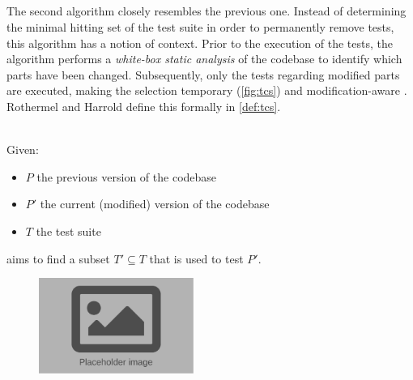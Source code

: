 
\subsection{\tcs{}}
The second algorithm closely resembles the previous one. Instead of determining the minimal hitting set of the test suite in order to permanently remove tests, this algorithm has a notion of context. Prior to the execution of the tests, the algorithm performs a \emph{white-box static analysis} of the codebase to identify which parts have been changed. Subsequently, only the tests regarding modified parts are executed, making the selection temporary (\autoref{fig:tcs}) and modification-aware \cite{10.1002/stv.430}. Rothermel and Harrold define this formally in \autoref{def:tcs}.

\begin{definition}[\tcs{}]
\label{def:tcs}
\mbox{}\\Given:
\begin{itemize}
	\item $P$ the previous version of the codebase
	\item $P'$ the current (modified) version of the codebase
	\item $T$ the test suite
\end{itemize}

\noindent \tcs{} aims to find a subset $T' \subseteq T$ that is used to test $P'$. 
\end{definition}

\begin{figure}[htbp!]
	\centering
	\includegraphics[width=0.45\textwidth]{assets/placeholder.pdf}
	\caption{\tcs{}}
	\label{fig:tcs}
\end{figure}